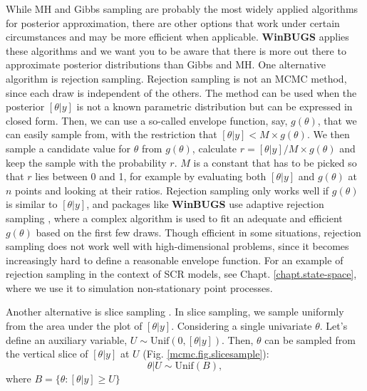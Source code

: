 While MH and Gibbs sampling are probably the most widely applied
algorithms for posterior approximation, there are other options that
work under certain circumstances and may be more efficient when
applicable. {\bf WinBUGS} applies these algorithms and we want you to be
aware that there is more out there to approximate posterior
distributions than Gibbs and MH.  One alternative algorithm is
rejection sampling. Rejection sampling is not an MCMC method, since
each draw is independent of the others. The method can be used when
the posterior $[\theta|y]$ is not a known parametric distribution but
can be expressed in closed form. Then, we can use a so-called envelope
function, say, $g(\theta)$, that we can easily sample from, with the
restriction that $[\theta|y] < M \times g(\theta)$. We then sample a
candidate value for $\theta$ from $g(\theta)$, calculate $r =
[\theta|y]/M \times g(\theta)$ and keep the sample with the probability
$r$. $M$ is a constant that has to be picked so that $r$ lies between
0 and 1, for example by evaluating both $[\theta|y]$ and $g(\theta)$
at $n$ points and looking at their ratios. Rejection sampling only
works well if $g(\theta)$ is similar to $[\theta|y]$, and packages
like {\bf WinBUGS} use adaptive rejection sampling \citep{gilks_wild:1992},
where a complex algorithm is used to fit an adequate and efficient
$g(\theta)$ based on the first few draws. 
Though efficient in some
situations, rejection sampling does not work well with
high-dimensional problems, since it becomes increasingly hard to
define a reasonable envelope function. For an example of rejection
sampling in the context of SCR models, see
Chapt. \ref{chapt.state-space}, where we use it to simulation
non-stationary point processes.  

Another alternative is slice sampling
\citep{neal:2003}. In slice sampling, we sample uniformly from the
area under the plot of $[\theta|y]$. Considering a single univariate
$\theta$. Let's define an auxiliary variable, $U \sim \mbox{Unif}(0,
[\theta|y])$. Then, $\theta$ can be sampled from the vertical slice
of $[\theta|y]$ at $U$ (Fig. \ref{mcmc.fig.slicesample}):
\[
\theta|U \sim \mbox{Unif}(B),
\]
where $B = \{\theta: [\theta|y] \geq U\}$

